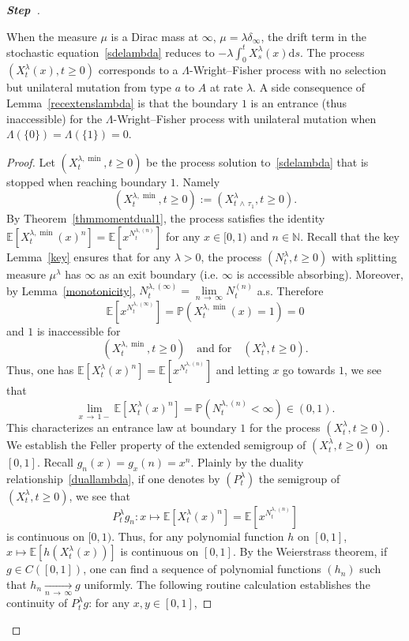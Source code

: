 \documentclass[AHL,Unicode,longabstracts,published]{cedram}
\newcommand{\ddr}{\mathrm{d}}
\newcommand{\bbN}{\mathbb{N}}
\newcommand{\bbE}{\mathbb{E}}
\newcommand{\bbP}{\mathbb{P}}
\newcounter{stepcount}
\newenvironment{step}{\refstepcounter{stepcount}\begin{proof}[\textbf{Step~\thestepcount}]}{\end{proof}}
\begin{document}
\begin{step}
\begin{rema}
When the measure $\mu$ is a Dirac mass at $\infty$, $\mu=\lambda\delta_{\infty}$, the drift term in the stochastic equation~\eqref{sdelambda} reduces to $-\lambda\int_{0}^{t}X_s^{\lambda}(x)\ddr s$. The process $(X_t^{\lambda}(x),t\geq 0)$ corresponds to a $\Lambda$-Wright--Fisher process with no selection but unilateral mutation from type $a$ to $A$ at rate $\lambda$. A side consequence of Lemma~\ref{recextenslambda} is that the boundary $1$ is an entrance (thus inaccessible) for the $\Lambda$-Wright--Fisher process with unilateral mutation when $\Lambda(\{0\})=\Lambda(\{1\})=0$.
\end{rema}

\begin{proof}
Let $(X_t^{\lambda,\min},t\geq 0)$ be the process solution to~\eqref{sdelambda} that is stopped when reaching boundary $1$. Namely 
\[
\left(X_t^{\lambda,\min},t\geq 0\right):=\left(X_{t\,\wedge\,\tau_1}^{\lambda},t\geq 0\right).
\]
By Theorem~\ref{thmmomentdual1}, the process satisfies the identity $\bbE[X_t^{\lambda,\min }(x)^n]=\bbE[x^{N_t^{\lambda,(n)}}]$ for any $x\in [0,1)$ and $n\in \bbN$. Recall that the key Lemma~\ref{key} ensures that for any $\lambda>0$, the process $(N^{\lambda}_t,t\geq 0)$ with splitting measure $\mu^{\lambda}$ has $\infty$ as an exit boundary (i.e. $\infty$ is accessible absorbing). Moreover, by Lemma~\ref{monotonicity}, $N_t^{\lambda,(\infty)}=\underset{n\,\rightarrow\,\infty}{\lim} N_t^{(n)}$ a.s. Therefore 
\[
\bbE\left[x^{N_t^{\lambda,(\infty)}}\right]=\bbP\left(X_t^{\lambda,\min }(x)=1\right)=0
\]
and $1$ is inaccessible for
\[
\left(X_t^{\lambda,\min },t\geq 0\right)\quad \text{and for}\quad\left(X_t^{\lambda},t\geq 0\right).
\]
Thus, one has $\bbE[X^{\lambda}_t(x)^n]=\bbE[x^{N_t^{\lambda,(n)}}]$ and letting $x$ go towards $1$, we see that
\[
\underset{x\,\rightarrow\,1-}{\lim}  \bbE\left[X^{\lambda}_t(x)^n\right]=\bbP\left(N_t^{\lambda,(n)}<\infty\right)\in (0,1).
\]
This characterizes an entrance law at boundary $1$ for the process $(X_t^{\lambda},t\geq 0)$. We establish the Feller property of the extended semigroup of $(X^{\lambda}_t,t\geq 0)$ on $[0,1]$. Recall $g_n(x)=g_x(n)=x^{n}$. Plainly by the duality relationship~\eqref{duallambda}, if one denotes by $(P^{\lambda}_t)$ the semigroup of $(X_t^{\lambda},t\geq 0)$, we see that
\[
P^{\lambda}_tg_n:x\mapsto \bbE\left[X_t^{\lambda}(x)^n\right]=\bbE\left[x^{N_t^{\lambda,(n)}}\right]
\]
is continuous on $[0,1)$. Thus, for any polynomial function $h$ on $[0,1]$, $x\mapsto \bbE[h(X_t^{\lambda}(x))]$ is continuous on $[0,1]$. By the Weierstrass theorem, if $g\in C([0,1])$, one can find a sequence of polynomial functions $(h_n)$ such that $h_n\underset{n\,\rightarrow\, \infty}{\longrightarrow} g $ uniformly. The following routine calculation establishes the continuity of $P^{\lambda}_t g$: for any $x,y\in [0,1]$,

\end{proof}
\end{step}
\end{document}
